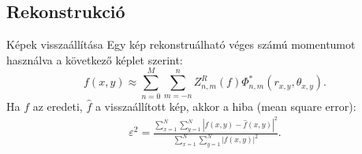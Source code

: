 \documentclass{beamer}
\begin{document}

\subsection{Rekonstrukció}
\begin{frame}{Képek visszaállítása}
\vskip 12mm
Egy kép rekonstruálható véges számú momentumot használva a következő képlet szerint:
$$
f(x,y) \approx \sum_{n=0}^{M}\sum_{m=-n}^{n}Z_{n,m}^R(f)\Phi_{n,m}^*(r_{x,y},\theta_{x,y}).
$$
Ha $f$ az eredeti, $\widehat{f}$ a visszaállított kép, akkor a hiba (mean square error):
\begin{gather*}
    \varepsilon^2 = \frac{\displaystyle \sum_{x=1}^N\sum_{y=1}^N \left|f(x,y) - \widehat{f}(x,y)\right|^2}{\displaystyle \sum_{x=1}^N\sum_{y=1}^N \left|f(x,y)\right|^2}.
\end{gather*}
\end{frame}
\end{document}
